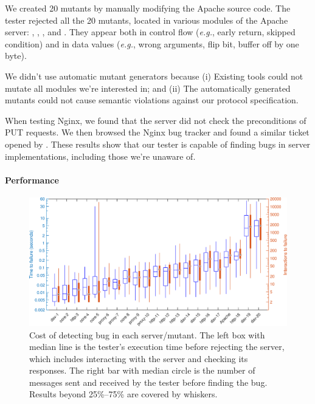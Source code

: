 We created 20 mutants by manually modifying the Apache source code.  The tester
rejected all the 20 mutants, located in various modules of the Apache server:
, , , and .  They appear
both in control flow ({\it e.g.}, early return, skipped condition) and in data
values ({\it e.g.}, wrong arguments, flip bit, buffer off by one byte).

We didn't use automatic mutant generators because (i) Existing tools could not
mutate all modules we're interested in; and (ii) The automatically generated
mutants could not cause semantic violations against our protocol specification.

When testing Nginx, we found that the server did not check the preconditions of
PUT requests.  We then browsed the Nginx bug tracker and found a similar ticket
opened by \textcite{nginx242}.  These results show that our tester is capable of
finding bugs in server implementations, including those we're unaware of.

\paragraph*{Performance}

\begin{figure}
  \includegraphics[width=\textwidth]{figures/http-time}
  \caption{Cost of detecting bug in each server/mutant.  The left box with
    median line is the tester's execution time before rejecting the server,
    which includes interacting with the server and checking its responses.  The
    right bar with median circle is the number of \http messages sent and
    received by the tester before finding the bug.  Results beyond
    25\%--75\% are covered by whiskers.
  }
  \label{fig:checker-performance}
\end{figure}

